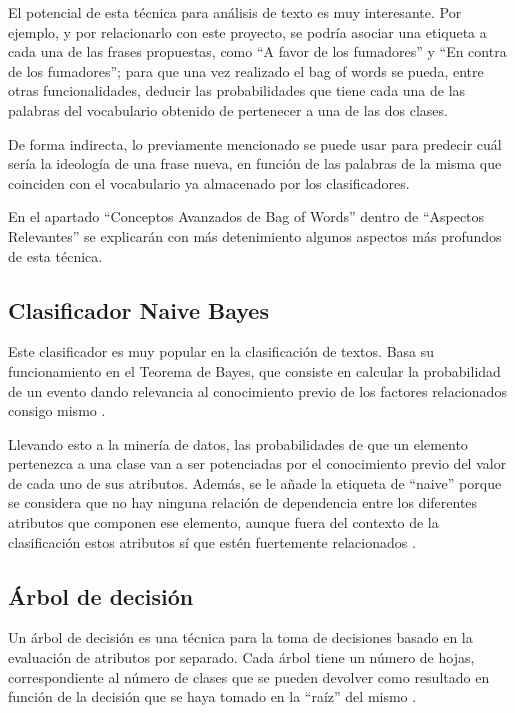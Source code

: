 El potencial de esta técnica para análisis de texto es muy interesante. Por ejemplo, y por relacionarlo con este proyecto, se podría asociar una etiqueta a cada una de las frases propuestas, como ``A favor de los fumadores'' y ``En contra de los fumadores''; para que una vez realizado el bag of words se pueda, entre otras funcionalidades, deducir las probabilidades que tiene cada una de las palabras del vocabulario obtenido de pertenecer a una de las dos clases.

De forma indirecta, lo previamente mencionado se puede usar para predecir cuál sería la ideología de una frase nueva, en función de las palabras de la misma que coinciden con el vocabulario ya almacenado por los clasificadores.

En el apartado ``Conceptos Avanzados de Bag of Words'' dentro de ``Aspectos Relevantes'' se explicarán con más detenimiento algunos aspectos más profundos de esta técnica.

\subsection{Clasificador Naive Bayes}

Este clasificador es muy popular en la clasificación de textos. Basa su funcionamiento en el Teorema de Bayes, que consiste en calcular la probabilidad de un evento dando relevancia al conocimiento previo de los factores relacionados consigo mismo \cite{bayestheorem}.

Llevando esto a la minería de datos, las probabilidades de que un elemento pertenezca a una clase van a ser potenciadas por el conocimiento previo del valor de cada uno de sus atributos. Además, se le añade la etiqueta de ``naive'' porque se considera que no hay ninguna relación de dependencia entre los diferentes atributos que componen ese elemento, aunque fuera del contexto de la clasificación estos atributos sí que estén fuertemente relacionados \cite{bayesclassifier}.

\subsection{Árbol de decisión}

Un árbol de decisión es una técnica para la toma de decisiones basado en la evaluación de atributos por separado. Cada árbol tiene un número de hojas, correspondiente al número de clases que se pueden devolver como resultado en función de la decisión que se haya tomado en la ``raíz'' del mismo \cite{decisiontree}.

